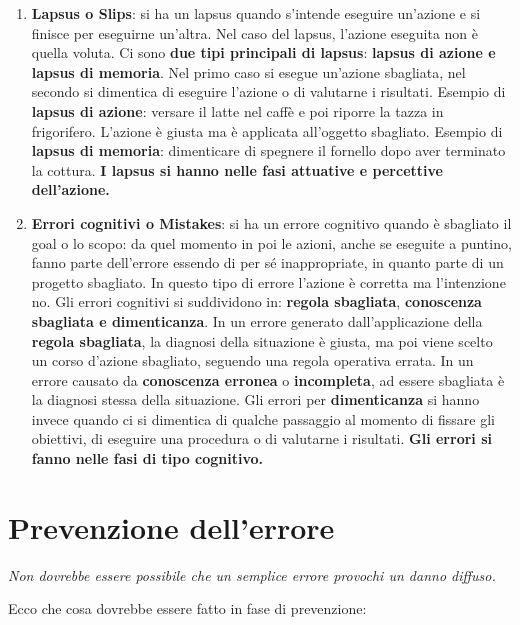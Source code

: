 \begin{enumerate}
	\item \textbf{Lapsus o Slips}: si ha un lapsus quando s'intende eseguire un'azione e si finisce per eseguirne un'altra. Nel caso del lapsus, l'azione eseguita non è quella voluta. Ci sono \textbf{due tipi principali di lapsus}:
	      \textbf{lapsus di azione e lapsus di memoria}.
	      Nel primo caso si esegue un'azione sbagliata, nel secondo si dimentica di eseguire
	      l'azione o di valutarne i risultati.
	      Esempio di \textbf{lapsus di azione}: versare il latte nel caffè e poi riporre la tazza in frigorifero. L'azione è giusta ma è applicata all'oggetto sbagliato.
	      Esempio di \textbf{lapsus di memoria}: dimenticare di spegnere il fornello dopo aver terminato la cottura. \textbf{I lapsus si hanno nelle fasi attuative e percettive dell'azione.}
	\item \textbf{Errori cognitivi o Mistakes}: si ha un errore cognitivo quando è sbagliato il goal o lo scopo: da quel momento in poi le azioni, anche se eseguite a puntino, fanno parte dell'errore essendo di per sé inappropriate, in quanto parte di un progetto sbagliato. In questo tipo di errore l'azione è corretta ma l'intenzione no.
	      Gli errori cognitivi si suddividono in: \textbf{regola sbagliata}, \textbf{conoscenza sbagliata e dimenticanza}. In un errore generato dall'applicazione della \textbf{regola sbagliata}, la
	      diagnosi della situazione è giusta, ma poi viene scelto un corso d'azione sbagliato,
	      seguendo una regola operativa errata. In un errore causato da \textbf{conoscenza erronea}
	      o \textbf{incompleta}, ad essere sbagliata è la diagnosi stessa della situazione. Gli errori per \textbf{dimenticanza} si hanno invece quando ci si dimentica di qualche passaggio al momento di fissare gli obiettivi, di eseguire una procedura o di valutarne i risultati. \textbf{Gli errori si fanno nelle fasi di tipo cognitivo.}
\end{enumerate}

\pagebreak

\section{Prevenzione dell'errore}

\begin{flushleft}
	\textit{Non dovrebbe essere possibile che un semplice errore provochi un danno diffuso.}
\end{flushleft}

Ecco che cosa dovrebbe essere fatto in fase di prevenzione:

